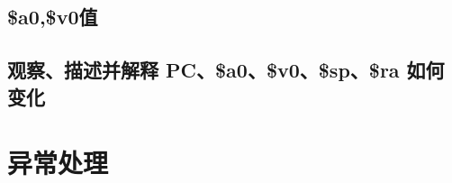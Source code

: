 \documentclass{article}
\begin{document}
\subsection{\$a0,\$v0值}

\subsection{观察、描述并解释 PC、\$a0、\$v0、\$sp、\$ra 如何变化}

\section{异常处理}

\end{document}
